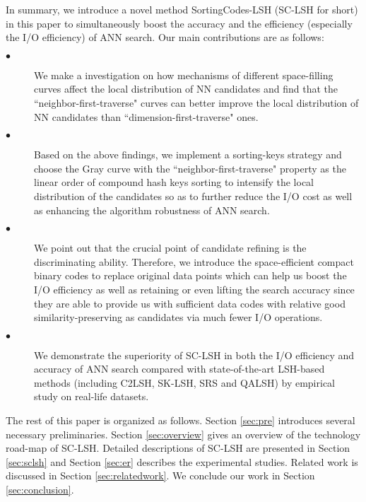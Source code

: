 \documentclass[twocolumn]{svjour3}          %
\begin{document}
In summary, we introduce a novel method SortingCodes-LSH (SC-LSH for short) in this paper to simultaneously boost the accuracy and the efficiency (especially the I/O efficiency) of ANN search. Our main contributions are as follows:
\begin{description}
	\item[$\bullet$] We make a investigation on how mechanisms of different space-filling curves affect the local distribution of NN candidates and find that the ``neighbor-first-traverse" curves can better improve the local distribution of NN candidates than ``dimension-first-traverse" ones.
	\item[$\bullet$] Based on the above findings, we implement a sorting-keys strategy and choose the Gray curve with the ``neighbor-first-traverse" property as the linear order of compound hash keys sorting to intensify the local distribution of the candidates so as to further reduce the I/O cost as well as enhancing the algorithm robustness of ANN search.
	\item[$\bullet$] We point out that the crucial point of candidate refining is the discriminating ability. Therefore, we introduce the space-efficient compact binary codes to replace original data points which can help us boost the I/O efficiency as well as retaining or even lifting the search accuracy since they are able to provide us with sufficient data codes with relative good similarity-preserving as candidates via much fewer I/O operations.
	\item[$\bullet$] We demonstrate the superiority of SC-LSH in both the I/O efficiency and accuracy of ANN search  compared with state-of-the-art LSH-based methods (including C2LSH, SK-LSH, SRS and QALSH) by empirical study on real-life datasets. 
\end{description}



The rest of this paper is organized as follows. Section \ref{sec:pre} introduces several necessary preliminaries. Section \ref{sec:overview} gives an overview of the technology road-map of SC-LSH. Detailed descriptions of SC-LSH are presented in Section \ref{sec:sclsh} and Section \ref{sec:er} describes the experimental studies. Related work is discussed in Section \ref{sec:relatedwork}. We conclude our work in Section \ref{sec:conclusion}.
\end{document}
